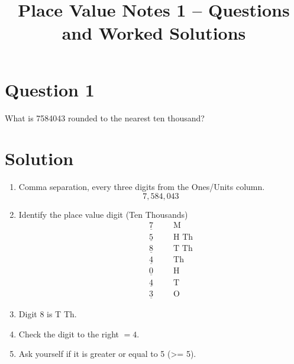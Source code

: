 \documentclass{article}
\date{}
\begin{document}
\fontsize{13}{15} \selectfont %

\title{Place Value Notes 1 – Questions and Worked Solutions}
\author{}
\date{}
\maketitle

\section*{Question 1}
What is 7584043 rounded to the nearest ten thousand?

\section*{Solution}
\begin{enumerate}[label=\textbf{Step \arabic*:}]
    \item Comma separation, every three digits from the Ones/Units column.
    \[7,584,043\]
    
    \item Identify the place value digit (Ten Thousands)
    \begin{align*}
    &\phantom{H}\underline{\phantom{H}7\phantom{H}} &&\text{M} \\
    &\phantom{H}\underline{\phantom{H}5\phantom{H}} &&\text{H Th} \\
    &\phantom{H}\underline{\phantom{H}8\phantom{H}} &&\text{T Th} \\
    &\phantom{H}\underline{\phantom{H}4\phantom{H}} &&\text{Th} \\
    &\phantom{H}\underline{\phantom{H}0\phantom{H}} &&\text{H} \\
    &\phantom{H}\underline{\phantom{H}4\phantom{H}} &&\text{T} \\
    &\phantom{H}\underline{\phantom{H}3\phantom{H}} &&\text{O}
    \end{align*}
    
    \item Digit 8 is T Th.
    
    \item Check the digit to the right \( = 4 \).
    
    \item Ask yourself if it is greater or equal to 5 (>= 5).
    

\end{enumerate}
\end{document}
